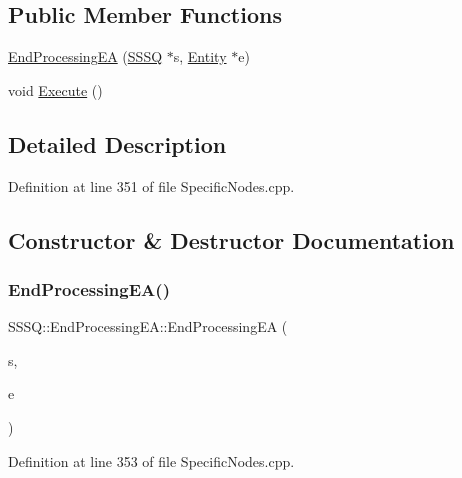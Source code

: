 \subsection*{Public Member Functions}
\begin{DoxyCompactItemize}
\item 
\hyperlink{class_s_s_s_q_1_1_end_processing_e_a_a0346a53be04c74fc6c6909693ffe94d3}{End\+Processing\+EA} (\hyperlink{class_s_s_s_q}{S\+S\+SQ} $\ast$s, \hyperlink{class_entity}{Entity} $\ast$e)
\item 
void \hyperlink{class_s_s_s_q_1_1_end_processing_e_a_a58123dc9ac0660bd1da11407e5467968}{Execute} ()
\end{DoxyCompactItemize}


\subsection{Detailed Description}


Definition at line 351 of file Specific\+Nodes.\+cpp.



\subsection{Constructor \& Destructor Documentation}
\mbox{\label{class_s_s_s_q_1_1_end_processing_e_a_a0346a53be04c74fc6c6909693ffe94d3}} 
\subsubsection{\texorpdfstring{End\+Processing\+E\+A()}{EndProcessingEA()}}
{\footnotesize\ttfamily S\+S\+S\+Q\+::\+End\+Processing\+E\+A\+::\+End\+Processing\+EA (\begin{DoxyParamCaption}\item[{\hyperlink{class_s_s_s_q}{S\+S\+SQ} $\ast$}]{s,  }\item[{\hyperlink{class_entity}{Entity} $\ast$}]{e }\end{DoxyParamCaption})\hspace{0.3cm}{\ttfamily [inline]}}



Definition at line 353 of file Specific\+Nodes.\+cpp.



